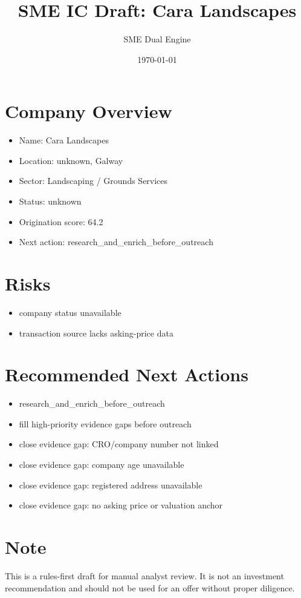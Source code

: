 \documentclass[11pt,a4paper]{article}
\title{SME IC Draft: Cara Landscapes}
\author{SME Dual Engine}
\date{\today}
\begin{document}
\maketitle
\section*{Company Overview}
\begin{itemize}[leftmargin=1.4em]
\item Name: Cara Landscapes
\item Location: unknown, Galway
\item Sector: Landscaping / Grounds Services
\item Status: unknown
\item Origination score: 64.2
\item Next action: research\_and\_enrich\_before\_outreach
\end{itemize}
\section*{Risks}
\begin{itemize}[leftmargin=1.4em]
\item company status unavailable
\item transaction source lacks asking-price data
\end{itemize}
\section*{Recommended Next Actions}
\begin{itemize}[leftmargin=1.4em]
\item research\_and\_enrich\_before\_outreach
\item fill high-priority evidence gaps before outreach
\item close evidence gap: CRO/company number not linked
\item close evidence gap: company age unavailable
\item close evidence gap: registered address unavailable
\item close evidence gap: no asking price or valuation anchor
\end{itemize}
\section*{Note}
This is a rules-first draft for manual analyst review. It is not an investment
recommendation and should not be used for an offer without proper diligence.
\end{document}
